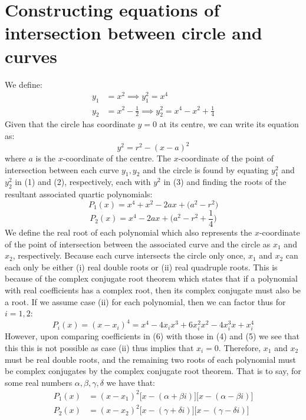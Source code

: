 \documentclass{article}
\author{}
\date{}
\begin{document}
\section{Constructing equations of intersection between circle and curves}
\noindent We define: 
\begin{align*}
\tag{1}y_1 &= x^2 \implies y_1^2 = x^4 \\
\tag{2}y_2 &= x^2-\frac{1}{2} \implies y_2^2=x^4-x^2+\frac{1}{4}
\end{align*}
\noindent Given that the circle has coordinate $y=0$ at its centre, we can write its equation as: 
\begin{equation}\tag{3}y^2=r^2-(x-a)^2 \end{equation}
where $a$ is the $x$-coordinate of the centre. The $x$-coordinate of the point of intersection between each curve $y_1,y_2$ and the circle is found by equating $y_1^2$ and $y_2^2$ in (1) and (2), respectively, each with $y^2$ in (3) and finding the roots of the resultant associated quartic polynomials:
\begin{equation}
\tag{4}P_1(x)=x^4+x^2-2ax+\big(a^2-r^2\big)    
\end{equation}
\begin{equation}
\tag{5}P_2(x)=x^4-2ax+\bigg(a^2-r^2+\frac{1}{4}\bigg)    
\end{equation}
We define the real root of each polynomial which also represents the $x$-coordinate of the point of intersection between the associated curve and the circle as $x_1$ and $x_2$, respectively. Because each curve intersects the circle only once, $x_1$ and $x_2$ can each only be either (i) real double roots or (ii) real quadruple roots. This is because of the complex conjugate root theorem which states that if a polynomial with real coefficients has a complex root, then its complex conjugate must also be a root. If we assume case (ii) for each polynomial, then we can factor thus for $i=1,2$:
\begin{equation}
    \tag{6}P_i(x)=(x-x_i)^4=x^4-4x_ix^3+6x_i^2x^2-4x_i^3x+x_i^4
\end{equation}
However, upon comparing coefficients in (6) with those in (4) and (5) we see that this this is not possible as case (ii) thus implies that $x_i=0$. Therefore, $x_1$ and $x_2$ must be real double roots, and the remaining two roots of each polynomial must be complex conjugates by the complex conjugate root theorem. That is to say, for some real numbers $\alpha,\beta,\gamma,\delta$ we have that:
\begin{align*}
\tag{7}P_1(x) &= (x-x_1)^2\big[x-(\alpha + \beta i)\big]\big[x-(\alpha-\beta i)\big] \\
\tag{8}P_2(x) &= (x-x_2)^2\big[x-(\gamma + \delta i)\big]\big[x-(\gamma-\delta i)\big] 
\end{align*}
\end{document}
